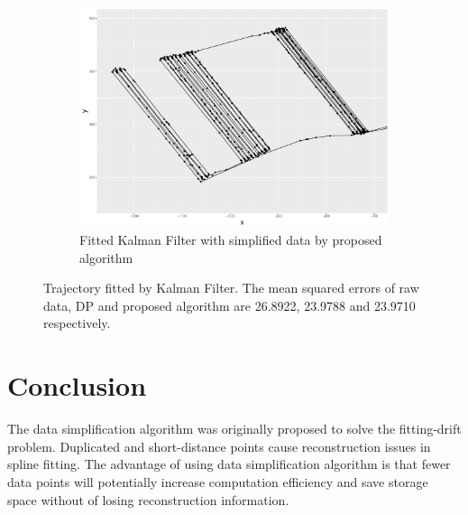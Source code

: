 \begin{figure}[h]
\begin{subfigure}[t]{0.47\textwidth}
\includegraphics[width=\linewidth]{Chapters/06Spinoff/plot/ggSPKF.pdf}
\caption{Fitted Kalman Filter with simplified data by proposed algorithm}
\end{subfigure}
\caption{Trajectory fitted by Kalman Filter. The mean squared errors of raw data, DP and proposed algorithm are 26.8922, 23.9788 and 23.9710 respectively.}\label{DataSimpKFTra}
\end{figure}


\section{Conclusion}

The data simplification algorithm was originally proposed to solve the fitting-drift problem. Duplicated and short-distance points cause reconstruction issues in spline fitting. The advantage of using data simplification algorithm is that fewer data points will potentially increase computation efficiency and save storage space without of losing reconstruction information.  

